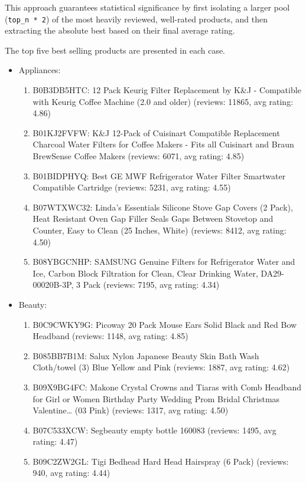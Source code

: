 \documentclass[a4paper, 12pt]{article}
\begin{document}
This approach guarantees statistical significance by first isolating a larger pool (\texttt{top\_n * 2}) of the most heavily reviewed, well-rated products, and then extracting the absolute best based on their final average rating.


The top five best selling products are presented in each case.
\begin{itemize}
    \item Appliances:
        \begin{enumerate}
            \item B0B3DB5HTC: 12 Pack Keurig Filter Replacement by K\&J - Compatible with Keurig Coffee Machine (2.0 and older) (reviews: 11865, avg rating: 4.86)
            \item B01KJ2FVFW: K\&J 12-Pack of Cuisinart Compatible Replacement Charcoal Water Filters for Coffee Makers - Fits all Cuisinart and Braun BrewSense Coffee Makers (reviews: 6071, avg rating: 4.85)
            \item B01BIDPHYQ: Best GE MWF Refrigerator Water Filter Smartwater Compatible Cartridge (reviews: 5231, avg rating: 4.55)
            \item B07WTXWC32: Linda's Essentials Silicone Stove Gap Covers (2 Pack), Heat Resistant Oven Gap Filler Seals Gaps Between Stovetop and Counter, Easy to Clean (25 Inches, White) (reviews: 8412, avg rating: 4.50)
            \item B08YBGCNHP: SAMSUNG Genuine Filters for Refrigerator Water and Ice, Carbon Block Filtration for Clean, Clear Drinking Water, DA29-00020B-3P, 3 Pack (reviews: 7195, avg rating: 4.34)
        \end{enumerate}    
    \item Beauty:
        \begin{enumerate}
            \item B0C9CWKY9G: Picoway 20 Pack Mouse Ears Solid Black and Red Bow Headband (reviews: 1148, avg rating: 4.85)
            \item B085BB7B1M: Salux Nylon Japanese Beauty Skin Bath Wash Cloth/towel (3) Blue Yellow and Pink (reviews: 1887, avg rating: 4.62)
            \item B09X9BG4FC: Makone Crystal Crowns and Tiaras with Comb Headband for Girl or Women Birthday Party Wedding Prom Bridal Christmas Valentine… (03 Pink) (reviews: 1317, avg rating: 4.50)
            \item B07C533XCW: Segbeauty empty bottle 160083 (reviews: 1495, avg rating: 4.47)
            \item B09C2ZW2GL: Tigi Bedhead Hard Head Hairspray (6 Pack) (reviews: 940, avg rating: 4.44)

\end{enumerate}
\end{itemize}
\end{document}
